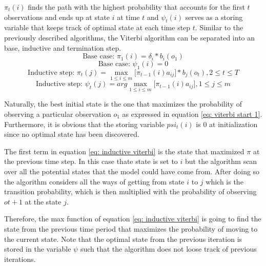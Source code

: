 $\pi_t(i)$ finds the path with the highest probability that accounts for the first $t$ observations and ends up at state $i$ at time $t$ and $\psi_t(i)$ serves as a storing variable that keeps track of optimal state at each time step $t$. Similar to the previously described algorithms, the Viterbi algorithm can be separated into an base, inductive and termination step.
\begin{equation}
    \text{Base case: } \pi_1(i) = \delta_i*b_i(o_1)
    \label{eq: viterbi start 1}
\end{equation}
\begin{equation}
     \text{Base case: } \psi_1(i) = 0 
\end{equation}
\begin{equation}
    \text{Inductive step: } \pi_t(j) = \max_{1\leq i \leq m}\Big[\pi_{t-1}(i)a_{ij}\Big] *b_j(o_t), 2\leq t \leq T 
    \label{eq: inductive viterbi}
\end{equation}
\begin{equation}
    \text{Inductive step: }\psi_t(j) = {arg\max_{1\leq i \leq m} \Big[\pi_{t-1}(i)a_{ij}\Big]}, {1\leq j \leq m}
    \label{eq: inductive viterbi 2}
\end{equation}

Naturally, the best initial state is the one that maximizes the probability of observing a particular observation $o_1$ as expressed in equation \ref{eq: viterbi start 1}. Furthermore, it is obvious that the storing variable $psi_t(i)$ is 0 at initialization since no optimal state has been discovered.

The first term in equation \ref{eq: inductive viterbi} is the state that maximized $\pi$ at the previous time step. In this case thate state is set to $i$ but the algorithm scan over all the potential states that the model could have come from. After doing so the algorithm considers all the ways of getting from state  $i$ to $j$ which is the transition probability, which is then multiplied with the probability of observing $ot+1$ at the state $j$. 

Therefore, the max function of equation \ref{eq: inductive viterbi} is going to find the state from the previous time period that maximizes the probability of moving to the current state. Note that the optimal state from the previous iteration is stored in the variable $\psi$ such that the algorithm does not loose track of previous iterations. 

